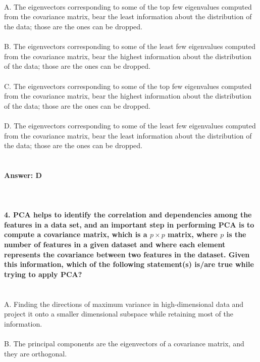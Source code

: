 \documentclass[prl,twocolumn,showpacs,preprintnumbers,superscriptaddress]{revtex4}
\theoremstyle{plain}
\theoremstyle{definition}
\begin{document}
\begin{widetext}
\\
\\
\\
\noindent A. The eigenvectors corresponding to some of the top few eigenvalues computed from the covariance matrix, bear the least information about the distribution of the data; those are the ones can be dropped.
\\
\\
B. The eigenvectors corresponding to some of the least few eigenvalues computed from the covariance matrix, bear the highest information about the distribution of the data; those are the ones can be dropped.
\\
\\
C. The eigenvectors corresponding to some of the top few eigenvalues computed from the covariance matrix, bear the highest information about the distribution of the data; those are the ones can be dropped.
\\
\\
D. The eigenvectors corresponding to some of the least few eigenvalues computed from the covariance matrix, bear the least information about the distribution of the data; those are the ones can be dropped.
\\
\\
\\
\textbf{Answer: D}
\\
\\
\\
\\
\textbf{4. PCA helps to identify the correlation and dependencies among the features in a data set, and an important step in performing PCA is to compute a covariance matrix, which is a $p \times p$ matrix, where $p$ is the number of features in a given dataset and where each element represents the covariance between two features in the dataset. Given this information, which of the following statement(s) is/are true while trying to apply PCA?}
\\
\\
\\
\noindent A. Finding the directions of maximum variance in high-dimensional data and project it onto a smaller dimensional subspace while retaining most of the information.
\\
\\
B. The principal components are the eigenvectors of a covariance matrix, and they are orthogonal.
\\
\\

\end{widetext}
\end{document}
